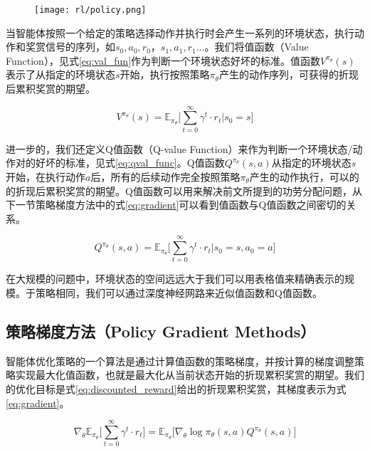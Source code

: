 \begin{figure}
  \centering
    \centering
    \texttt{[image: rl/policy.png]}
    \label{fig:policy}    
\end{figure}

当智能体按照一个给定的策略选择动作并执行时会产生一系列的环境状态，执行动作和奖赏信号的序列，如$s_0, a_0, r_0，s_1, a_1, r_1 ...$。我们将值函数（Value Function），见式\ref{eq:val_fun}作为判断一个环境状态好坏的标准。值函数$V^{\pi_\theta}(s)$表示了从指定的环境状态$s$开始，执行按照策略$\pi_\theta$产生的动作序列，可获得的折现后累积奖赏的期望。

\begin{equation}
  \label{eq:val_func}
  	V^{\pi_\theta}(s)=\mathbb{E}_{\pi_\theta}\bigg[\sum_{t=0}^{\infty} {\gamma^{t}} \cdot r_{t}|s_0=s\bigg]
\end{equation}

进一步的，我们还定义Q值函数（Q-value Function）来作为判断一个环境状态/动作对的好坏的标准，见式\ref{eq:qval_func}。Q值函数$Q^{\pi_\theta}(s,a)$从指定的环境状态$s$开始，在执行动作$a$后，所有的后续动作完全按照策略$\pi_\theta$产生的动作执行，可以的的折现后累积奖赏的期望。Q值函数可以用来解决前文所提到的功劳分配问题\cite{michalski2013machine}\cite{sutton1998reinforcement}，从下一节策略梯度方法中的式\ref{eq:gradient}可以看到值函数与Q值函数之间密切的关系。

\begin{equation}
  \label{eq:qval_func}
  	Q^{\pi_\theta}(s,a)=\mathbb{E}_{\pi_\theta}\bigg[\sum_{t=0}^{\infty} {\gamma^{t}} \cdot r_{t}|s_0=s, a_0=a\bigg]
\end{equation}

在大规模的问题中，环境状态的空间远远大于我们可以用表格值来精确表示的规模。于策略相同，我们可以通过深度神经网路来近似值函数和Q值函数。

\subsection{策略梯度方法（Policy Gradient Methods）}

智能体优化策略的一个算法是通过计算值函数的策略梯度，并按计算的梯度调整策略实现最大化值函数，也就是最大化从当前状态开始的折现累积奖赏的期望。我们的优化目标是式\ref{eq:discounted_reward}给出的折现累积奖赏，其梯度表示为式\ref{eq:gradient}\cite{sutton1998reinforcement}。

\begin{equation}
  \label{eq:gradient}
  	\nabla_{\theta}\mathbb{E}_{\pi_\theta}\bigg[\sum_{t=0}^{\infty} {\gamma^{t}} \cdot r_{t}\bigg]= \mathbb{E}_{\pi_\theta}\big[\nabla_\theta\operatorname{log}\pi_\theta(s,a)Q^{\pi_\theta}(s,a) \big]
\end{equation}

